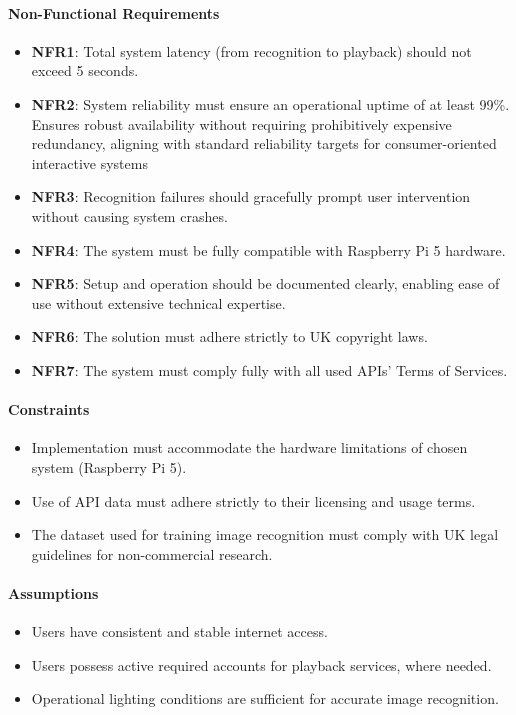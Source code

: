             \paragraph{Non-Functional Requirements}
                \begin{itemize}
                    \item \textbf{NFR1}: Total system latency (from recognition to playback) should not exceed 5 seconds.
                    \item \textbf{NFR2}: System reliability must ensure an operational uptime of at least 99\%. Ensures robust availability without requiring prohibitively expensive redundancy, aligning with standard reliability targets for consumer-oriented interactive systems
                    \item \textbf{NFR3}: Recognition failures should gracefully prompt user intervention without causing system crashes.
                    \item \textbf{NFR4}: The system must be fully compatible with Raspberry Pi 5 hardware.
                    \item \textbf{NFR5}: Setup and operation should be documented clearly, enabling ease of use without extensive technical expertise.
                    \item \textbf{NFR6}: The solution must adhere strictly to UK copyright laws.
                    \item \textbf{NFR7}: The system must comply fully with all used APIs' Terms of Services.
                \end{itemize}
            
            \paragraph{Constraints}
                \begin{itemize}
                    \item Implementation must accommodate the hardware limitations of chosen system (Raspberry Pi 5).
                    \item Use of API data must adhere strictly to their licensing and usage terms.
                    \item The dataset used for training image recognition must comply with UK legal guidelines for non-commercial research.
                \end{itemize}
            
            \paragraph{Assumptions}
                \begin{itemize}
                    \item Users have consistent and stable internet access.
                    \item Users possess active required accounts for playback services, where needed.
                    \item Operational lighting conditions are sufficient for accurate image recognition.
                \end{itemize}
    
